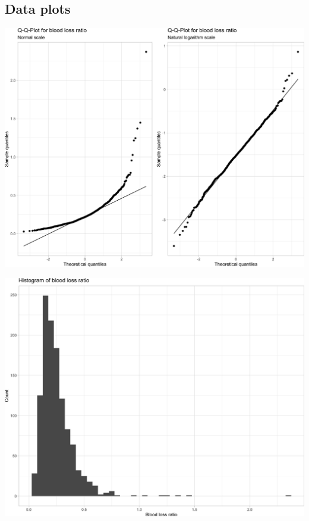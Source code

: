 \documentclass[
]{article}
\begin{document}
\hypertarget{data-plots}{%
\subsection{Data plots}\label{data-plots}}

\begin{center}\includegraphics[width=1\linewidth]{notebook_files/figure-latex/data_plots-1} \end{center}

\begin{center}\includegraphics[width=1\linewidth]{notebook_files/figure-latex/data_plots-2} \end{center}
\end{document}

